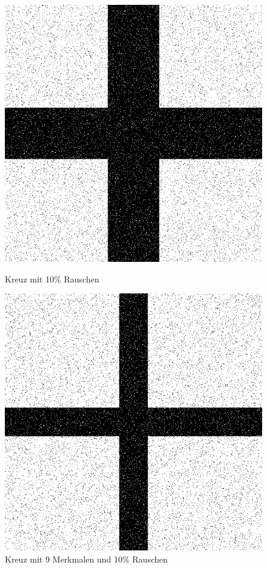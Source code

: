 \begin{figure}[hbt]
	\begin{minipage}{0.49 \textwidth}
		\includegraphics[width=\textwidth]{./Bilder/Auswertung/BeispielBilder/Picture_Crossing_noise_10_pixelCnt_128_featureCnt_5}
		\caption{Kreuz mit 10\% Rauschen}
	\end{minipage}
	\hfill
	\begin{minipage}{0.49 \textwidth}
		\includegraphics[width=\textwidth]{./Bilder/Auswertung/BeispielBilder/Picture_Crossing_noise_10_pixelCnt_65_featureCnt_9}
		\caption{Kreuz mit 9 Merkmalen und 10\% Rauschen}
		\label{585px9M65pM10}
	\end{minipage}
\end{figure}

